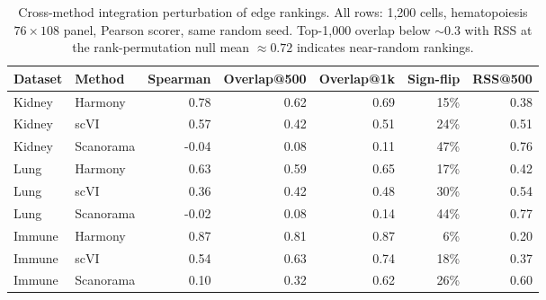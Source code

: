 \documentclass[12pt]{article}
\begin{document}
\begin{table}[ht]
\centering
\caption{Cross-method integration perturbation of edge rankings.
All rows: 1{,}200 cells, hematopoiesis $76 \times 108$ panel,
Pearson scorer, same random seed. Top-1{,}000 overlap below $\sim 0.3$
with RSS at the rank-permutation null mean $\approx 0.72$ indicates
near-random rankings.}
\label{tab:integration_methods}
\small
\begin{tabular}{llrrrrr}
\toprule
\textbf{Dataset} & \textbf{Method} & \textbf{Spearman} &
\textbf{Overlap@500} & \textbf{Overlap@1k} &
\textbf{Sign-flip} & \textbf{RSS@500} \\
\midrule
Kidney & Harmony    &  0.78 & 0.62 & 0.69 & 15\% & 0.38 \\
Kidney & scVI       &  0.57 & 0.42 & 0.51 & 24\% & 0.51 \\
Kidney & Scanorama  & -0.04 & 0.08 & 0.11 & 47\% & 0.76 \\
Lung   & Harmony    &  0.63 & 0.59 & 0.65 & 17\% & 0.42 \\
Lung   & scVI       &  0.36 & 0.42 & 0.48 & 30\% & 0.54 \\
Lung   & Scanorama  & -0.02 & 0.08 & 0.14 & 44\% & 0.77 \\
Immune & Harmony    &  0.87 & 0.81 & 0.87 &  6\% & 0.20 \\
Immune & scVI       &  0.54 & 0.63 & 0.74 & 18\% & 0.37 \\
Immune & Scanorama  &  0.10 & 0.32 & 0.62 & 26\% & 0.60 \\
\bottomrule
\end{tabular}
\end{table}
\end{document}
